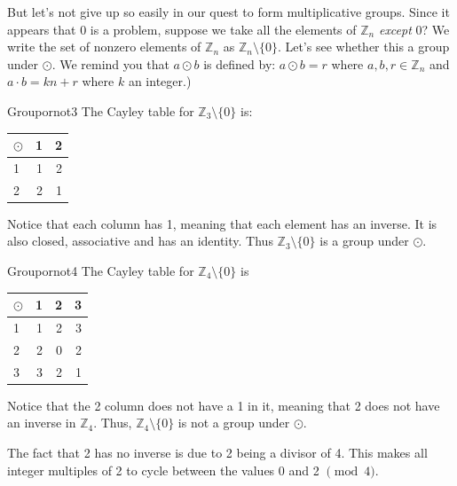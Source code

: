 But let's not give up so easily in our quest to form multiplicative groups. Since it appears that 0 is a problem, suppose we take all the elements of $\mathbb{Z}_n$ \emph{except} 0? We write the set of nonzero elements of $\mathbb{Z}_n$ as $\mathbb{Z}_n \setminus \{0\} $. Let's see whether this a group under $\odot$. We remind you that $a \odot b$  is defined by: $a \odot b = r$ where $a,b,r\in \mathbb{Z}_n$ and $a \cdot b = kn + r$ where $k$ an integer.)


\begin{example}{Groupornot3}
The Cayley table for $\mathbb{Z}_3 \setminus \{0\}$ is:


\begin{tabular}{ l | r r  }
  $\odot$ & 1 & 2 \\
  \hline
  1 & 1 & 2 \\
  2 & 2 & 1 \\
\end{tabular}


Notice that each column has 1, meaning that each element has an inverse.  It is also closed, associative and has an identity. Thus $\mathbb{Z}_3 \setminus \{0\}$ is a group under $\odot$.  
\end{example}


\begin{example}{Groupornot4}
The Cayley table for $\mathbb{Z}_4 \setminus \{0\}$ is


\begin{tabular}{ l | r r r }
  $\odot$ & 1 & 2 & 3\\
  \hline
  1 & 1 & 2 & 3\\
  2 & 2 & 0 & 2\\
  3 & 3 & 2 & 1\\
\end{tabular}

Notice that the 2 column does not have a 1 in it, meaning that 2 does not have an inverse in $\mathbb{Z}_4$. Thus, $\mathbb{Z}_4 \setminus \{0\}$ is not a group under $\odot$.
\end{example}

The fact that 2 has no inverse is due to 2 being a divisor of 4.  This makes all integer multiples of 2 to cycle between the values 0 and 2 $\pmod 4$. 


